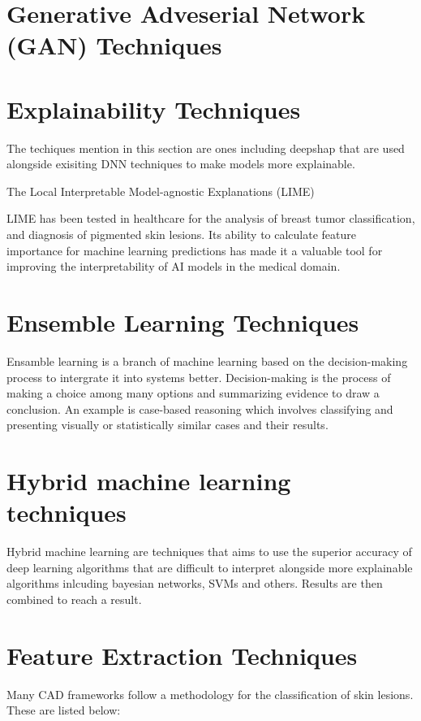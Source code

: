 \section{Generative Adveserial Network (GAN) Techniques}


\section{Explainability Techniques}
The techiques mention in this section are ones including deepshap that are used alongside exisiting DNN techniques to make models more explainable.

The Local Interpretable Model-agnostic Explanations (LIME)

LIME has been tested in healthcare for the analysis of breast tumor classification\cite{rafferty2022}, and diagnosis of pigmented skin lesions\cite{duell2021}. Its ability to calculate feature importance for machine learning predictions has made it a valuable tool for improving the interpretability of AI models in the medical domain.

\section{Ensemble Learning Techniques}
Ensamble learning is a branch of machine learning based on the decision-making process to intergrate it into systems better\cite{xu2022}. Decision-making is the process of making a choice among many options and summarizing evidence to draw a conclusion. An example is case-based reasoning which involves classifying and presenting visually or statistically similar cases and their results.


\section{Hybrid machine learning techniques}
Hybrid machine learning are techniques that aims to use the superior accuracy of deep learning algorithms that are difficult to interpret alongside more explainable algorithms inlcuding bayesian networks, SVMs and others. Results are then combined to reach a result.

\section{Feature Extraction Techniques}
Many CAD frameworks follow a methodology for the classification of skin lesions. These are listed below:

